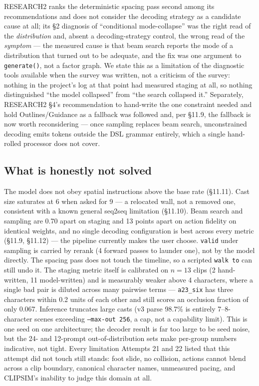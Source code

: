 \documentclass[11pt]{article}
\newcommand{\secsym}{\S}
\begin{document}
RESEARCH2 ranks the deterministic spacing pass second among its
recommendations and does not consider the decoding strategy as a
candidate cause at all; its \secsym2 diagnosis of ``conditional
mode-collapse'' was the right read of the \emph{distribution} and, absent
a decoding-strategy control, the wrong read of the \emph{symptom} --- the
measured cause is that beam search reports the mode of a distribution
that turned out to be adequate, and the fix was one argument to
\texttt{generate()}, not a factor graph. We state this as a limitation of
the diagnostic tools available when the survey was written, not a
criticism of the survey: nothing in the project's log at that point had
measured staging at all, so nothing distinguished ``the model collapsed''
from ``the search collapsed it.'' Separately, RESEARCH2 \secsym4's
recommendation to hand-write the one constraint needed and hold
Outlines/Guidance as a fallback was followed and, per \secsym11.9, the
fallback is now worth reconsidering --- once sampling replaces beam
search, unconstrained decoding emits tokens outside the DSL grammar
entirely, which a single hand-rolled processor does not cover.

\subsection{What is honestly not solved}
\label{sec:notsolved-a23}

The model does not obey spatial instructions above the base rate
(\secsym11.11). Cast size saturates at 6 when asked for 9 --- a
relocated wall, not a removed one, consistent with a known general
seq2seq limitation (\secsym11.10). Beam search and sampling are 0.70
apart on staging and 13 points apart on action fidelity on identical
weights, and no single decoding configuration is best across every
metric (\secsym11.9, \secsym11.12) --- the pipeline currently makes the
user choose. \texttt{valid} under sampling is carried by rerank (4
forward passes to launder one), not by the model directly. The spacing
pass does not touch the timeline, so a scripted \texttt{walk to} can
still undo it. The staging metric itself is calibrated on $n=13$ clips
(2 hand-written, 11 model-written) and is measurably weaker above 4
characters, where a single bad pair is diluted across many pairwise
terms --- \texttt{a23\_six} has three characters within 0.2 units of
each other and still scores an occlusion fraction of only 0.067.
Inference truncates large casts (v3 parse 98.7\% is entirely 7--8-
character scenes exceeding \texttt{--max-out 256}, a cap, not a
capability limit). This is one seed on one architecture; the decoder
result is far too large to be seed noise, but the 24- and 12-prompt
out-of-distribution sets make per-group numbers indicative, not tight.
Every limitation Attempts 21 and 22 listed that this attempt did not
touch still stands: foot slide, no collision, actions cannot blend
across a clip boundary, canonical character names, unmeasured pacing,
and CLIPSIM's inability to judge this domain at all.
\end{document}
